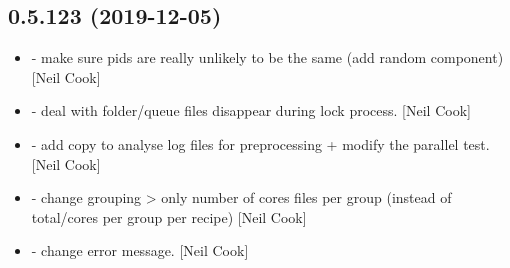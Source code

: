 \documentclass[a4paper,10pt,english]{report}
\begin{document}
\subsection{0.5.123 (2019-12-05)}
\label{\detokenize{misc/changelog:id19}}\begin{itemize}
\item {} 
 - make sure pids are really unlikely to be the
same (add random component) {[}Neil Cook{]}

\item {} 
 - deal with folder/queue files disappear during lock
process. {[}Neil Cook{]}

\item {} 
 - add copy to analyse log files for preprocessing +
modify the parallel test. {[}Neil Cook{]}

\item {} 
 - change grouping \textendash{}\textgreater{} only number
of cores files per group (instead of total/cores per group  per
recipe) {[}Neil Cook{]}

\item {} 
 - change error message. {[}Neil
Cook{]}

\end{itemize}
\end{document}
